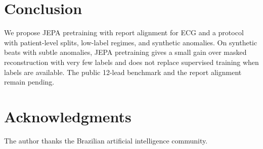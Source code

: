 \documentclass[conference]{IEEEtran}
\begin{document}
\section{Conclusion}
We propose JEPA pretraining with report alignment for ECG and a protocol with patient-level splits, low-label regimes, and synthetic anomalies. On synthetic beats with subtle anomalies, JEPA pretraining gives a small gain over masked reconstruction with very few labels and does not replace supervised training when labels are available. The public 12-lead benchmark and the report alignment remain pending.

\section*{Acknowledgments}
The author thanks the Brazilian artificial intelligence community.

\nocite{ctl_full_names}


\end{document}
